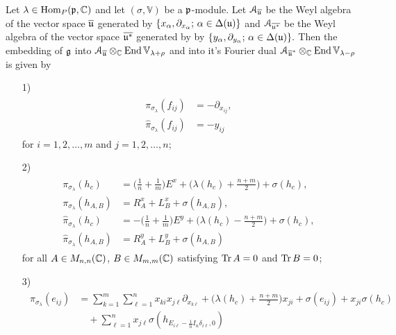 \begin{theorem}\label{thm:action AGS}
Let $\lambda \in \mathrm{Hom}_P(\mathfrak{p},\mathbb{C})$ and let $(\sigma,\mathbb{V})$ be a $\mathfrak{p}$-module. Let $\EuScript{A}_{\overline{\mathfrak{u}}}$ be the Weyl algebra of the vector space $\overline{\mathfrak{u}}$ generated by $\{x_\alpha,\partial_{x_\alpha};\, \alpha \in \Delta(\mathfrak{u})\}$ and $\EuScript{A}_{\overline{\mathfrak{u}^*}}$ be the Weyl algebra of the vector space $\overline{\mathfrak{u}^*}$ generated by by $\{y_\alpha,\partial_{y_\alpha};\, \alpha \in \Delta(\mathfrak{u})\}.$  Then the embedding of $\mathfrak{g}$ into $\EuScript{A}_{\overline{\mathfrak{u}}} \otimes_{\mathbb{C}} \mathop {\rm End} \nolimits \mathbb{V}_{\lambda+\rho}$ and into it's Fourier dual $\EuScript{A}_{\overline{\mathfrak{u}}^*} \otimes_{\mathbb{C}} \mathop {\rm End} \nolimits \mathbb{V}_{\lambda-\rho}$ is given by
\begin{enumerate}
\item[1)]
\begin{align}
\begin{aligned}
  \pi_{\sigma_\lambda}(f_{ij})&=-\partial_{x_{ij}}, \\
  \hat{\pi}_{\sigma_\lambda}(f_{ij})&=-y_{ij}
\end{aligned}
\end{align}
for $i=1,2,\dots,m$ and $j=1,2,\dots,n$;
\item[2)]
\begin{align}
  \begin{aligned}
    \pi_{\sigma_\lambda}(h_c)&= \bigg(\frac{1}{n} + \frac{1}{m}\bigg) E^x + \bigg(\lambda(h_c)+ \frac{n+m}{2}\bigg) + \sigma(h_c), \\[1mm]
    \pi_{\sigma_\lambda}(h_{A,B})&= R_A^x +L_B^x + \sigma(h_{A,B}), \\[1mm]
    \hat{\pi}_{\sigma_\lambda}(h_c)&= -\bigg(\frac{1}{n} + \frac{1}{m}\bigg) E^y +  \bigg(\lambda(h_c) - \frac{n+m}{2}\bigg) + \sigma(h_c), \\[1mm]
    \hat{\pi}_{\sigma_\lambda}(h_{A,B})&= R_A^y + L_B^y + \sigma(h_{A,B})
  \end{aligned}
\end{align}
for all $A \in M_{n,n}(\mathbb{C})$, $B \in M_{m,m}(\mathbb{C})$ satisfying $\operatorname{\mathrm{Tr}} A =0$ and $\operatorname{\mathrm{Tr}} B = 0$;
\item[3)]
\begin{align}
  \begin{aligned}
    \pi_{\sigma_\lambda}(e_{ij})&= \sum_{k=1}^m \sum_{\ell=1}^n x_{ki} x_{j\ell} \partial_{x_{k\ell}}  + \bigg(\lambda(h_c)+ \frac{n+m}{2}\bigg) x_{ji} + \sigma(e_{ij}) + x_{ji}\sigma(h_c)
    \\ &\quad + \sum_{\ell=1}^n x_{j\ell} \sigma(h_{E_{i\ell}-\frac{1}{n}I_n \delta_{i \ell},0})

\end{aligned}
\end{align}
\end{enumerate}
\end{theorem}
